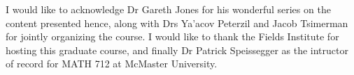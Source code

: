 %
%


I would like to acknowledge Dr Gareth Jones for his wonderful series on the content presented hence, along with Drs Ya'acov Peterzil and Jacob Tsimerman for jointly organizing the course. I would like to thank the Fields Institute for hosting this graduate course, and finally Dr Patrick Speissegger as the intructor of record for MATH 712 at McMaster University.
